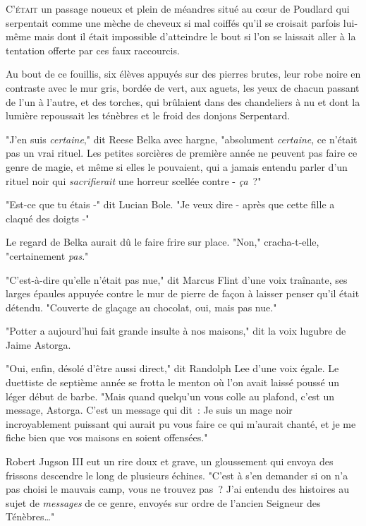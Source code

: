 
\lettrine{C}{'était} un passage noueux et plein de méandres situé au cœur de Poudlard qui serpentait comme une mèche de cheveux si mal coiffés qu'il se croisait parfois lui-même mais dont il était impossible d'atteindre le bout si l'on se laissait aller à la tentation offerte par ces faux raccourcis.

Au bout de ce fouillis, six élèves appuyés sur des pierres brutes, leur robe noire en contraste avec le mur gris, bordée de vert, aux aguets, les yeux de chacun passant de l'un à l'autre, et des torches, qui brûlaient dans des chandeliers à nu et dont la lumière repoussait les ténèbres et le froid des donjons Serpentard.

"J'en suis \emph{certaine}," dit Reese Belka avec hargne, "absolument \emph{certaine}, ce n'était pas un vrai rituel. Les petites sorcières de première année ne peuvent pas faire ce genre de magie, et même si elles le pouvaient, qui a jamais entendu parler d'un rituel noir qui \emph{sacrifierait} une horreur scellée contre - \emph{ça}~?"

"Est-ce que tu étais -" dit Lucian Bole. "Je veux dire - après que cette fille a claqué des doigts -"

Le regard de Belka aurait dû le faire frire sur place. "Non," cracha-t-elle, "certainement \emph{pas}."

"C'est-à-dire qu'elle n'était pas nue," dit Marcus Flint d'une voix traînante, ses larges épaules appuyée contre le mur de pierre de façon à laisser penser qu'il était détendu. "Couverte de glaçage au chocolat, oui, mais pas nue."

"Potter a aujourd'hui fait grande insulte à nos maisons," dit la voix lugubre de Jaime Astorga.

"Oui, enfin, désolé d'être aussi direct," dit Randolph Lee d'une voix égale. Le duettiste de septième année se frotta le menton où l'on avait laissé poussé un léger début de barbe. "Mais quand quelqu'un vous colle au plafond, c'est un message, Astorga. C'est un message qui dit~: Je suis un mage noir incroyablement puissant qui aurait pu vous faire ce qui m'aurait chanté, et je me fiche bien que vos maisons en soient offensées."

Robert Jugson III eut un rire doux et grave, un gloussement qui envoya des frissons descendre le long de plusieurs échines. "C'est à s'en demander si on n'a pas choisi le mauvais camp, vous ne trouvez pas~? J'ai entendu des histoires au sujet de \emph{messages} de ce genre, envoyés sur ordre de l'ancien Seigneur des Ténèbres…"

